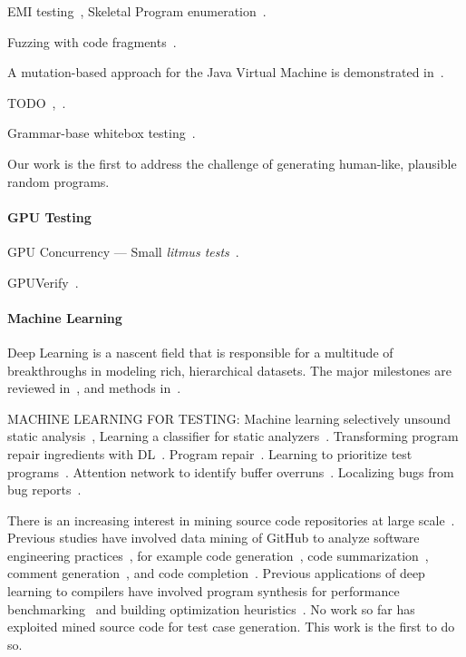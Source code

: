 
EMI testing~\cite{Le2013a}, Skeletal Program enumeration~\cite{Zhang2017a}.

Fuzzing with code fragments~\cite{Holler2012}.

A mutation-based approach for the Java Virtual Machine is demonstrated in~\cite{Chena}.

TODO~\cite{White2016},~\cite{Sheridan2007}.

Grammar-base whitebox testing~\cite{Godefroid2008a}.

Our work is the first to address the challenge of generating human-like, plausible random programs.

\paragraph{GPU Testing} GPU Concurrency --- Small \emph{litmus tests}~\cite{Alglave2015}.

GPUVerify~\cite{Bardsley2014}.


\paragraph{Machine Learning} Deep Learning is a nascent field that is responsible for a multitude of breakthroughs in modeling rich, hierarchical datasets. The major milestones are reviewed in~\cite{Wang2017}, and methods in~\cite{Schmidhuber2014}.

MACHINE LEARNING FOR TESTING: Machine learning selectively unsound static analysis~\cite{Heo2017}, Learning a classifier for static analyzers~\cite{Koc2017}.
Transforming program repair ingredients with DL~\cite{White}. Program repair~\cite{Koukoutos2017a}. Learning to prioritize test programs~\cite{Chen2017}. Attention network to identify buffer overruns~\cite{Choi2016}. Localizing bugs from bug reports~\cite{Lam2016,Huo2016}.

There is an increasing interest in mining source code repositories at large scale~\cite{Allamanis2013a,White2015a,Bird2009}. Previous studies have involved data mining of GitHub to analyze software engineering practices~\cite{Wu2014,Guzman2014,Baishakhi2014a,Vasilescu2015}, for example code generation~\cite{Zhang2015a}, code summarization~\cite{Allamanis2016}, comment generation~\cite{Wong2013}, and code completion~\cite{Raychev2014}. Previous applications of deep learning to compilers have involved program synthesis for performance benchmarking~\cite{Cummins2017a} and building optimization heuristics~\cite{Cummins2017b}. No work so far has exploited mined source code for test case generation. This work is the first to do so.
